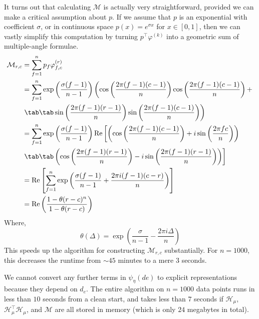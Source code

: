 \documentclass{article}
\renewcommand{\Re}{\textrm{Re}}
\begin{document}
It turns out that calculating $\mathcal M$ is actually very straightforward, provided we can make a critical assumption about $p$. If we assume that $p$ is an exponential with coefficient $\sigma$, or in continuous space $p(x)=e^{\sigma x}$ for $x\in[0,1]$, then we can vastly simplify this computation by turning $p^\top\varphi^{(k)}$ into a geometric sum of multiple-angle formulae.
\begin{align*}
    \mathcal M_{r,c}&=\sum_{f=1}^np_f\varphi_{f,c}^{(r)} \\
    &=\sum_{f=1}^n\exp\left(\frac{\sigma(f-1)}{n-1}\right)\left(\cos\left(\frac{2\pi (f-1)(c-1)}n\right)\cos\left(\frac{2\pi (f-1)(c-1)}n\right)+\right.\\
    &\left.\tab\tab\sin\left(\frac{2\pi (f-1)(r-1)}n\right)\sin\left(\frac{2\pi (f-1)(c-1)}n\right)\right) \\
    &=\sum_{f=1}^n\exp\left(\frac{\sigma(f-1)}{n-1}\right)\Re\left[\left(\cos\left(\frac{2\pi (f-1)(c-1)}n\right)+i\sin\left(\frac{2\pi fc}n\right)\right)\right.
    \\&\left.\tab\tab\left(\cos\left(\frac{2\pi (f-1)(r-1)}n\right)-i\sin\left(\frac{2\pi (f-1)(r-1)}n\right)\right)\right] \\
    &=\Re\left[\sum_{f=1}^n\exp\left(\frac{\sigma(f-1)}{n-1}+\frac{2\pi i (f-1)(c-r)}n\right)\right] \\
    &=\Re\left(\frac{1-\theta(r-c)^n}{1-\theta(r-c)}\right)
\end{align*}
Where,
$$\theta(\Delta)=\exp\left(\frac\sigma{n-1}-\frac{2\pi i\Delta}n\right)$$
This speeds up the algorithm for constructing $\mathcal M_{r,c}$ substantially. For $n=1000$, this decreases the runtime from $\sim45$ minutes to a mere $3$ seconds.

We cannot convert any further terms in $\psi_\eta(de)$ to explicit representations because they depend on $d_e$. The entire algorithm on $n=1000$ data points runs in less than $10$ seconds from a clean start, and takes less than $7$ seconds if $\mathcal H_\mu$, $\mathcal H_\mu^\top\mathcal H_\mu$, and $\mathcal M$ are all stored in memory (which is only $24$ megabytes in total).
\end{document}
